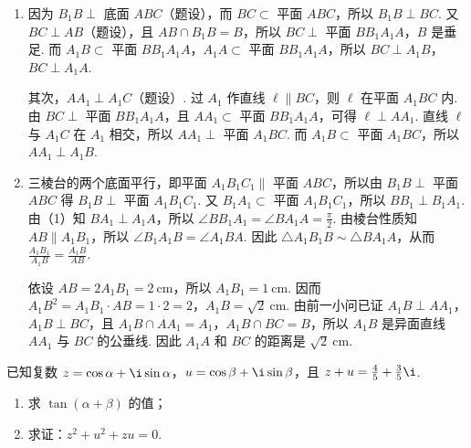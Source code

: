 \begin{solution}
\begin{enumerate}
\item 因为 \(B_{1}B \perp\) 底面 \(ABC\)（题设），而 \(BC\subset\) 平面 \(ABC\)，所以 \(B_1B \perp BC\). 又 \(BC \perp AB\)（题设），且 \(AB \cap B_1B = B\)，所以 \(BC \perp\) 平面 \(BB_{1}A_{1}A\)，\(B\) 是垂足. 而 \(A_1B \subset\) 平面 \(BB_1A_1A\)，\(A_1A \subset\) 平面 \(BB_1A_1A\)，所以 \(BC \perp A_1B\)，\(BC \perp A_1A\).

其次，\(AA_1 \perp A_1C\)（题设）. 过 \(A_1\) 作直线 \(\ell\parallel BC\)，则 \(\ell\) 在平面 \(A_1BC\) 内. 由 \(BC\perp\) 平面 \(BB_1A_1A\)，且 \(AA_1\subset\) 平面 \(BB_1A_1A\)，可得 \(\ell\perp AA_1\). 直线 \(\ell\) 与 \(A_1C\) 在 \(A_1\) 相交，所以 \(AA_1\perp\) 平面 \(A_1BC\). 而 \(A_1B\subset\) 平面 \(A_1BC\)，所以 \(AA_1\perp A_1B\).

\item 三棱台的两个底面平行，即平面 \(A_{1}B_{1}C_{1}\parallel\) 平面 \(ABC\)，所以由 \(B_{1}B \perp\) 平面 \(ABC\) 得 \(B_{1}B \perp\) 平面 \(A_{1}B_{1}C_{1}\). 又 \(B_{1}A_{1} \subset\) 平面 \(A_{1}B_{1}C_{1}\)，所以 \(BB_{1} \perp B_{1}A_{1}\). 由（1）知 \(BA_{1} \perp A_{1}A\)，所以 \(\angle BB_{1}A_{1}=\angle BA_{1}A=\frac{\pi}{2}\). 由棱台性质知 \(AB \parallel A_{1}B_{1}\)，所以 \(\angle B_{1}A_{1}B=\angle A_{1}BA\). 因此 \(\triangle A_{1}B_{1}B\sim\triangle BA_{1}A\)，从而 \(\frac{A_{1}B_{1}}{A_{1}B}=\frac{A_{1}B}{AB}\).

依设 \(AB = 2A_1B_1 = 2\mathrm{~cm}\)，所以 \(A_1B_1 = 1\mathrm{~cm}\). 因而 \(A_{1}B^{2}=A_{1}B_{1}\cdot AB=1\cdot2=2\)，\(A_{1}B=\sqrt{2}\mathrm{~cm}\). 由前一小问已证 \(A_{1}B \perp AA_{1}\)，\(A_{1}B \perp BC\)，且 \(A_{1}B \cap AA_{1} = A_{1}\)，\(A_{1}B \cap BC = B\)，所以 \(A_{1}B\) 是异面直线 \(AA_{1}\) 与 \(BC\) 的公垂线. 因此 \(A_{1}A\) 和 \(BC\) 的距离是 \(\sqrt{2}\mathrm{~cm}\).
\end{enumerate}
\end{solution}

\begin{problem}

已知复数 \(z = \cos \alpha + \i \sin \alpha\)，\(u = \cos \beta + \i \sin \beta\)，且 \(z + u = \frac{4}{5} + \frac{3}{5}\i\).

\begin{enumerate}
\item 求 \(\tan(\alpha+\beta)\) 的值；
\item 求证：\(z^{2}+u^{2}+zu=0\).
\end{enumerate}
\end{problem}


